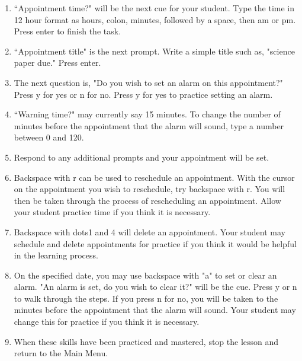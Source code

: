 \documentclass[10pt,letterpaper,twoside]{report}
\begin{document}
{{{\begin{enumerate}
	\item ``Appointment time?" will be the next cue for your student.  Type the time in 12 hour format as hours, colon, minutes, followed by a space, then am or pm.  Press enter to finish the task.
	\item ``Appointment title" is the next prompt.  Write a simple title such as, "science paper due." Press enter.
	\item The next question is, "Do you wish to set an alarm on this appointment?" Press y for yes or n for no.  Press y for yes to practice setting an alarm.
	\item ``Warning time?" may currently say 15 minutes.  To change the number of minutes before the appointment that the alarm will sound, type a number between 0 and 120.
	\item Respond to any additional prompts and your appointment will be set.
	\item Backspace with r can be used to reschedule an appointment.  With the cursor on the appointment you wish to reschedule, try backspace with r.  You will then be taken through the process of rescheduling an appointment.  Allow your student practice time if you think it is necessary.
	\item Backspace with dots1 and 4 will delete an appointment.  Your student may schedule and delete appointments for practice if you think it would be helpful in the learning process.
	\item On the specified date, you may use backspace with "a" to set or clear an alarm.  "An alarm is set, do you wish to clear it?" will be the cue.  Press y or n to walk through the steps.  If you press n for no, you will be taken to the minutes before the appointment that the alarm will sound.  Your student may change this for practice if you think it is necessary.
	\item When these skills have been practiced and mastered, stop the lesson and return to the Main Menu.
\end{enumerate}
\clearpage
}}}
\end{document}
